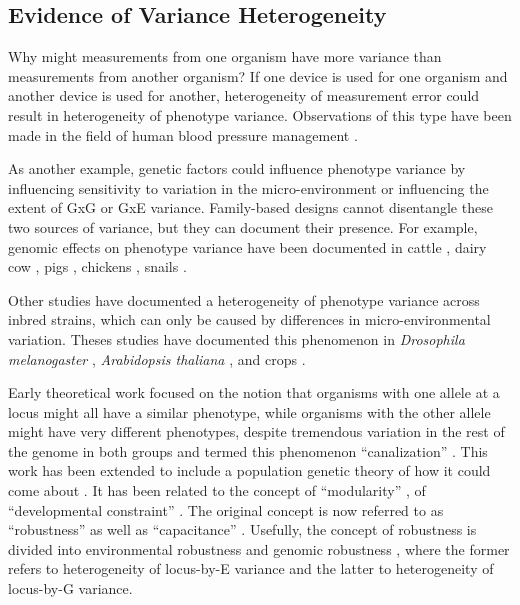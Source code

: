 \subsection{Evidence of Variance Heterogeneity}

Why might measurements from one organism have more variance than measurements from another organism?
If one device is used for one organism and another device is used for another, heterogeneity of measurement error could result in heterogeneity of phenotype variance.
Observations of this type have been made in the field of human blood pressure management \citep{Labarthe1973,Ataman1996,OBrien2001}.

As another example, genetic factors could influence phenotype variance by influencing sensitivity to variation in the micro-environment or influencing the extent of GxG or GxE variance.
Family-based designs cannot disentangle these two sources of variance, but they can document their presence.
For example, genomic effects on phenotype variance have been documented in cattle \citep{Visscher1992-ka,Mulder2008-pr,Fasoula2012-ji}, dairy cow \citep{clay1979heterogeneity}, pigs \citep{Ibanez-Escriche2008}, chickens \citep{Rowe2006}, snails \citep{Ros2004}.

Other studies have documented a heterogeneity of phenotype variance across inbred strains, which can only be caused by differences in micro-environmental variation.
Theses studies have documented this phenomenon in \textit{Drosophila melanogaster} \citep{Mackay2005,Mackay2005}, \textit{Arabidopsis thaliana} \citep{Hall2007}, and crops \citep{Walsh2017-vx}.


Early theoretical work focused on the notion that organisms with one allele at a locus might all have a similar phenotype, while organisms with the other allele might have very different phenotypes, despite tremendous variation in the rest of the genome in both groups and termed this phenomenon ``canalization'' \citep{Waddington1942,Waddington1959}.
This work has been extended to include a population genetic theory of how it could come about \citep{Wagner1997,Gibson2000,Meiklejohn2002}.
It has been related to the concept of ``modularity'' \citep{Wagner2007}, of ``developmental constraint'' \citep{Pavlicev2015-nu}.
The original concept is now referred to as ``robustness'' \citep{Kitano2004,Felix2015,Yadav2015-sw,Fraser2010} as well as ``capacitance'' \citep{Pettersson2015-bl,Queitsch2002}.
Usefully, the concept of robustness is divided into environmental robustness and genomic robustness \citep{Fraser2010}, where the former refers to heterogeneity of locus-by-E variance and the latter to heterogeneity of locus-by-G variance.


